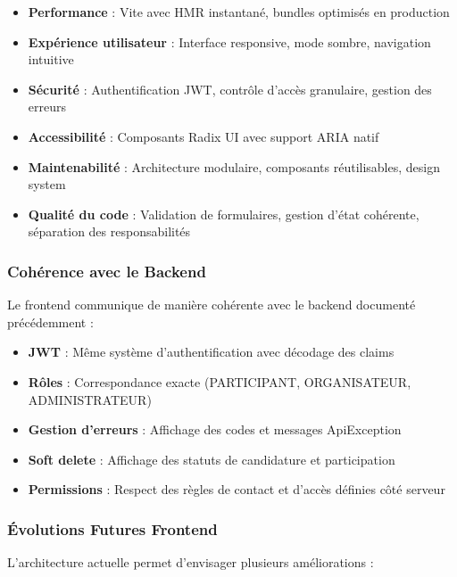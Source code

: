\begin{itemize}
    \item \textbf{Performance} : Vite avec HMR instantané, bundles optimisés en production
    \item \textbf{Expérience utilisateur} : Interface responsive, mode sombre, navigation intuitive
    \item \textbf{Sécurité} : Authentification JWT, contrôle d'accès granulaire, gestion des erreurs
    \item \textbf{Accessibilité} : Composants Radix UI avec support ARIA natif
    \item \textbf{Maintenabilité} : Architecture modulaire, composants réutilisables, design system
    \item \textbf{Qualité du code} : Validation de formulaires, gestion d'état cohérente, séparation des responsabilités
\end{itemize}

\subsubsection{Cohérence avec le Backend}

Le frontend communique de manière cohérente avec le backend documenté précédemment :

\begin{itemize}
    \item \textbf{JWT} : Même système d'authentification avec décodage des claims
    \item \textbf{Rôles} : Correspondance exacte (PARTICIPANT, ORGANISATEUR, ADMINISTRATEUR)
    \item \textbf{Gestion d'erreurs} : Affichage des codes et messages ApiException
    \item \textbf{Soft delete} : Affichage des statuts de candidature et participation
    \item \textbf{Permissions} : Respect des règles de contact et d'accès définies côté serveur
\end{itemize}

\subsubsection{Évolutions Futures Frontend}

L'architecture actuelle permet d'envisager plusieurs améliorations :

